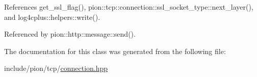 References get\-\_\-ssl\-\_\-flag(), pion\-::tcp\-::connection\-::ssl\-\_\-socket\-\_\-type\-::next\-\_\-layer(), and log4cplus\-::helpers\-::write().



Referenced by pion\-::http\-::message\-::send().



The documentation for this class was generated from the following file\-:\begin{DoxyCompactItemize}
\item 
include/pion/tcp/\hyperlink{connection_8hpp}{connection.\-hpp}\end{DoxyCompactItemize}
